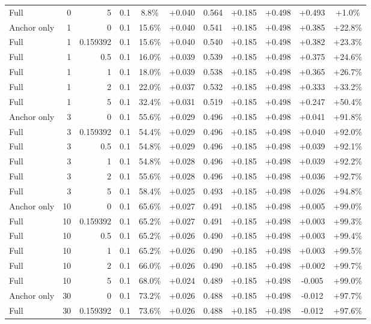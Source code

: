 \begin{table}[htbp]
\begin{tabular}{lrrrccccccc}
Full & 0 & 5 & 0.1 & 8.8\% & +0.040 & 0.564 & +0.185 & +0.498 & +0.493 & +1.0\% \\
Anchor only & 1 & 0 & 0.1 & 15.6\% & +0.040 & 0.541 & +0.185 & +0.498 & +0.385 & +22.8\% \\
Full & 1 & 0.159392 & 0.1 & 15.6\% & +0.040 & 0.540 & +0.185 & +0.498 & +0.382 & +23.3\% \\
Full & 1 & 0.5 & 0.1 & 16.0\% & +0.039 & 0.539 & +0.185 & +0.498 & +0.375 & +24.6\% \\
Full & 1 & 1 & 0.1 & 18.0\% & +0.039 & 0.538 & +0.185 & +0.498 & +0.365 & +26.7\% \\
Full & 1 & 2 & 0.1 & 22.0\% & +0.037 & 0.532 & +0.185 & +0.498 & +0.333 & +33.2\% \\
Full & 1 & 5 & 0.1 & 32.4\% & +0.031 & 0.519 & +0.185 & +0.498 & +0.247 & +50.4\% \\
Anchor only & 3 & 0 & 0.1 & 55.6\% & +0.029 & 0.496 & +0.185 & +0.498 & +0.041 & +91.8\% \\
Full & 3 & 0.159392 & 0.1 & 54.4\% & +0.029 & 0.496 & +0.185 & +0.498 & +0.040 & +92.0\% \\
Full & 3 & 0.5 & 0.1 & 54.8\% & +0.029 & 0.496 & +0.185 & +0.498 & +0.039 & +92.1\% \\
Full & 3 & 1 & 0.1 & 54.8\% & +0.028 & 0.496 & +0.185 & +0.498 & +0.039 & +92.2\% \\
Full & 3 & 2 & 0.1 & 55.6\% & +0.028 & 0.496 & +0.185 & +0.498 & +0.036 & +92.7\% \\
Full & 3 & 5 & 0.1 & 58.4\% & +0.025 & 0.493 & +0.185 & +0.498 & +0.026 & +94.8\% \\
Anchor only & 10 & 0 & 0.1 & 65.6\% & +0.027 & 0.491 & +0.185 & +0.498 & +0.005 & +99.0\% \\
Full & 10 & 0.159392 & 0.1 & 65.2\% & +0.027 & 0.491 & +0.185 & +0.498 & +0.003 & +99.3\% \\
Full & 10 & 0.5 & 0.1 & 65.2\% & +0.026 & 0.490 & +0.185 & +0.498 & +0.003 & +99.4\% \\
Full & 10 & 1 & 0.1 & 65.2\% & +0.026 & 0.490 & +0.185 & +0.498 & +0.003 & +99.5\% \\
Full & 10 & 2 & 0.1 & 66.0\% & +0.026 & 0.490 & +0.185 & +0.498 & +0.002 & +99.7\% \\
Full & 10 & 5 & 0.1 & 68.0\% & +0.024 & 0.489 & +0.185 & +0.498 & -0.005 & +99.0\% \\
Anchor only & 30 & 0 & 0.1 & 73.2\% & +0.026 & 0.488 & +0.185 & +0.498 & -0.012 & +97.7\% \\
Full & 30 & 0.159392 & 0.1 & 73.6\% & +0.026 & 0.488 & +0.185 & +0.498 & -0.012 & +97.6\% \\

\end{tabular}
\end{table}
